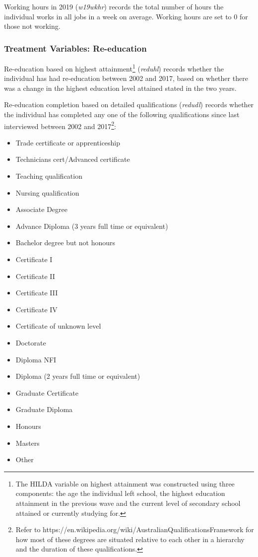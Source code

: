 \documentclass[12pt, a4paper]{article}
\begin{document}
Working hours in 2019 (\textit{w19\textunderscore{}wkhr}) records the total number of hours the individual works in all jobs in a week on average. Working hours are set to 0 for those not working. 

\subsubsection{Treatment Variables: Re-education}
Re-education based on highest attainment\footnote{The HILDA variable on highest attainment was constructed using three components: the age the individual left school, the highest education attainment in the previous wave and the current level of secondary school attained or currently studying for.} (\textit{reduhl}) records whether the individual has had re-education between 2002 and 2017, based on whether there was a change in the highest education level attained stated in the two years.  

Re-education completion based on detailed qualifications (\textit{redudl}) records whether the individual has completed any one of the following qualifications since last interviewed between 2002 and 2017\footnote{Refer to https://en.wikipedia.org/wiki/Australian\textunderscore{}Qualifications\textunderscore{}Framework for how most of these degrees are situated relative to each other in a hierarchy and the duration of these qualifications.}:

\begin{itemize}
  \item Trade certificate or apprenticeship
  \item Technicians cert/Advanced certificate
  \item Teaching qualification 
  \item Nursing qualification 
  \item Associate Degree
  \item Advance Diploma (3 years full time or equivalent)
  \item Bachelor degree but not honours
  \item Certificate I
  \item Certificate II
  \item Certificate III
  \item Certificate IV
  \item Certificate of unknown level
  \item Doctorate
  \item Diploma NFI
  \item Diploma (2 years full time or equivalent)
  \item Graduate Certificate
  \item Graduate Diploma 
  \item Honours 
  \item Masters 
  \item Other 
\end{itemize}  
\end{document}
